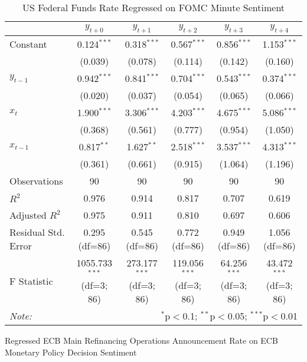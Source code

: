 \documentclass [12pt]{article}
\begin{document}
\begin{table}[H] \centering
  \caption{US Federal Funds Rate Regressed on FOMC Minute Sentiment}
  \begin{adjustbox}{width=\textwidth}
\begin{tabular}{lccccc}
\hline
\hline
 & $y_{t+0}$ & $y_{t+1}$ & $y_{t+2}$ & $y_{t+3}$ & $y_{t+4}$  \\
\hline
 Constant & 0.124$^{***}$ & 0.318$^{***}$ & 0.567$^{***}$ & 0.856$^{***}$ & 1.153$^{***}$ \\
& (0.039) & (0.078) & (0.114) & (0.142) & (0.160) \\
 $y_{t-1}$ & 0.942$^{***}$ & 0.841$^{***}$ & 0.704$^{***}$ & 0.543$^{***}$ & 0.374$^{***}$ \\
& (0.020) & (0.037) & (0.054) & (0.065) & (0.066) \\
 $x_{t}$ & 1.900$^{***}$ & 3.306$^{***}$ & 4.203$^{***}$ & 4.675$^{***}$ & 5.086$^{***}$ \\
& (0.368) & (0.561) & (0.777) & (0.954) & (1.050) \\
 $x_{t-1}$ & 0.817$^{**}$ & 1.627$^{**}$ & 2.518$^{***}$ & 3.537$^{***}$ & 4.313$^{***}$ \\
& (0.361) & (0.661) & (0.915) & (1.064) & (1.196) \\
\hline
 Observations & 90 & 90 & 90 & 90 & 90 \\
 $R^2$ & 0.976 & 0.914 & 0.817 & 0.707 & 0.619 \\
 Adjusted $R^2$ & 0.975 & 0.911 & 0.810 & 0.697 & 0.606 \\
 Residual Std. Error & 0.295 (df=86) & 0.545 (df=86) & 0.772 (df=86) & 0.949 (df=86) & 1.056 (df=86) \\
 F Statistic & 1055.733$^{***}$ (df=3; 86) & 273.177$^{***}$ (df=3; 86) & 119.056$^{***}$ (df=3; 86) & 64.256$^{***}$ (df=3; 86) & 43.472$^{***}$ (df=3; 86) \\
\hline
\hline
\textit{Note:} & \multicolumn{5}{r}{$^{*}$p$<$0.1; $^{**}$p$<$0.05; $^{***}$p$<$0.01} \\
\end{tabular}
\end{adjustbox}
\end{table}

 Regressed ECB Main Refinancing Operations Announcement Rate on ECB Monetary Policy Decision Sentiment
\end{document}
